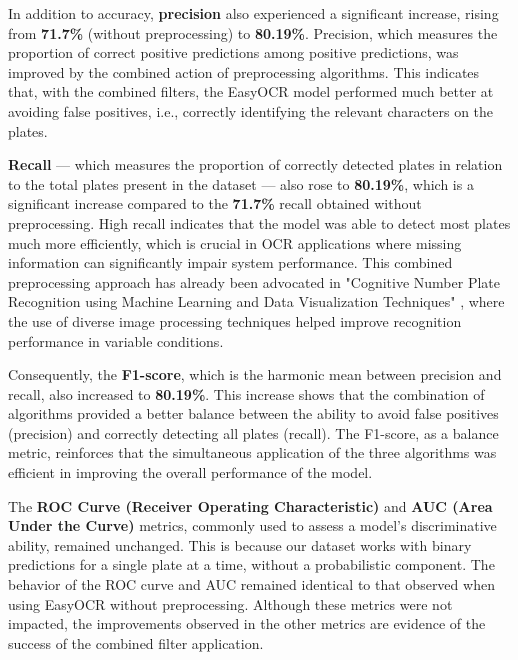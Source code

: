 \documentclass[conference]{IEEEtran}
\begin{document}
	In addition to accuracy, \textbf{precision} also experienced a significant increase, rising from \textbf{71.7\%} (without preprocessing) to \textbf{80.19\%}. Precision, which measures the proportion of correct positive predictions among positive predictions, was improved by the combined action of preprocessing algorithms. This indicates that, with the combined filters, the EasyOCR model performed much better at avoiding false positives, i.e., correctly identifying the relevant characters on the plates.
	
	\textbf{Recall} — which measures the proportion of correctly detected plates in relation to the total plates present in the dataset — also rose to \textbf{80.19\%}, which is a significant increase compared to the \textbf{71.7\%} recall obtained without preprocessing. High recall indicates that the model was able to detect most plates much more efficiently, which is crucial in OCR applications where missing information can significantly impair system performance. This combined preprocessing approach has already been advocated in "Cognitive Number Plate Recognition using Machine Learning and Data Visualization Techniques" \cite{b6}, where the use of diverse image processing techniques helped improve recognition performance in variable conditions.
	
	Consequently, the \textbf{F1-score}, which is the harmonic mean between precision and recall, also increased to \textbf{80.19\%}. This increase shows that the combination of algorithms provided a better balance between the ability to avoid false positives (precision) and correctly detecting all plates (recall). The F1-score, as a balance metric, reinforces that the simultaneous application of the three algorithms was efficient in improving the overall performance of the model.
	
	The \textbf{ROC Curve (Receiver Operating Characteristic)} and \textbf{AUC (Area Under the Curve)} metrics, commonly used to assess a model's discriminative ability, remained unchanged. This is because our dataset works with binary predictions for a single plate at a time, without a probabilistic component. The behavior of the ROC curve and AUC remained identical to that observed when using EasyOCR without preprocessing. Although these metrics were not impacted, the improvements observed in the other metrics are evidence of the success of the combined filter application.
	
\end{document}
